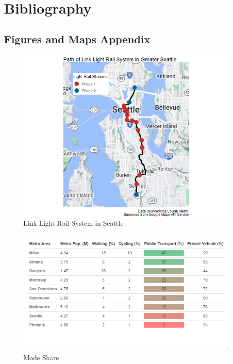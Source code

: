 \documentclass{article}
\begin{document}
\newpage

\section{Bibliography}
\printbibliography

\newpage

\begin{appendices}

\section{Figures and Maps Appendix}
\label{appendix:maps}

\begin{figure}[h]
\caption{Link Light Rail System in Seattle}
\label{maps:link}
\centering
\includegraphics[width=1.0\textwidth]{Maps/link_light_rail_map.png}
\end{figure}

\begin{figure}[h]
\caption{Mode Share}
\label{maps:mode}
\centering
\includegraphics[width=1.0\textwidth]{Tables/mode_share.png}
\end{figure}


\end{appendices}
\end{document}
